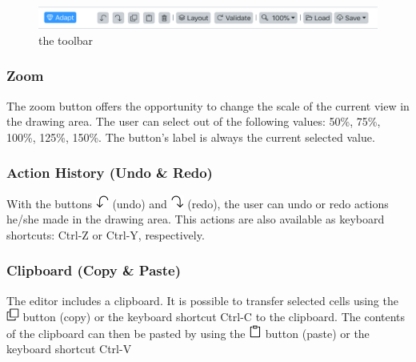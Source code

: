 \documentclass[a4paper,top=25mm,bottom=25mm,12pt,pdftex,halfparskip,twoside,bibtotoc,numbers=noenddot]{scrbook}
\begin{document}
\begin{figure}[H]
\centering
\includegraphics[width=\textwidth]{toolbar}
\caption{the toolbar}
\label{fig:editor-toolbar}
\end{figure}

\subsubsection{Zoom}

The zoom button offers the opportunity to change the scale of the current view in the drawing area. The user can select out of the following values: 50\%, 75\%, 100\%, 125\%, 150\%. The button's label is always the current selected value.

\subsubsection{Action History (Undo \& Redo)}

With the buttons \includegraphics[height=12pt]{editor-toolbar-undo} (undo) and \includegraphics[height=12pt]{editor-toolbar-redo} (redo), the user can undo or redo actions he/she made in the drawing area. This actions are also available as keyboard shortcuts: \textsf{Ctrl-Z} or \textsf{Ctrl-Y}, respectively.

\subsubsection{Clipboard (Copy \& Paste)}

The editor includes a clipboard. It is possible to transfer selected cells using the \includegraphics[height=12pt]{editor-toolbar-clone}
 button (copy) or the keyboard shortcut \textsf{Ctrl-C} to the clipboard.
The contents of the clipboard can then be pasted by using the \includegraphics[height=12pt]{editor-toolbar-clipboard} button (paste) or the keyboard shortcut \textsf{Ctrl-V}
\end{document}
